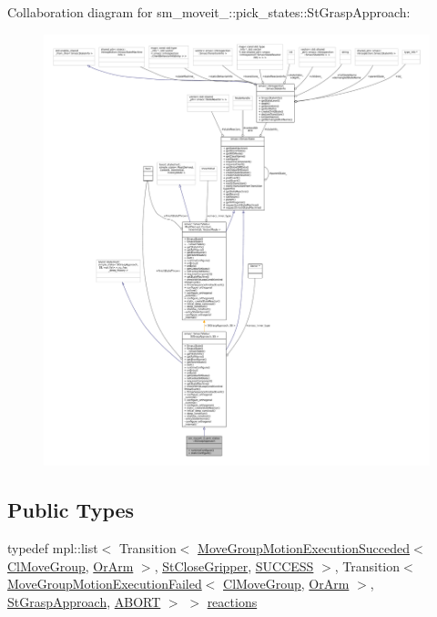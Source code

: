 Collaboration diagram for sm\+\_\+moveit\+\_\+:\+:pick\+\_\+states\+:\+:St\+Grasp\+Approach\+:
\nopagebreak
\begin{figure}[H]
\begin{center}
\leavevmode
\includegraphics[width=350pt]{structsm__moveit__2_1_1pick__states_1_1StGraspApproach__coll__graph}
\end{center}
\end{figure}
\subsection*{Public Types}
\begin{DoxyCompactItemize}
\item 
typedef mpl\+::list$<$ Transition$<$ \hyperlink{structmove__group__interface__client_1_1MoveGroupMotionExecutionSucceded}{Move\+Group\+Motion\+Execution\+Succeded}$<$ \hyperlink{classmove__group__interface__client_1_1ClMoveGroup}{Cl\+Move\+Group}, \hyperlink{classsm__moveit__2_1_1OrArm}{Or\+Arm} $>$, \hyperlink{structsm__moveit__2_1_1pick__states_1_1StCloseGripper}{St\+Close\+Gripper}, \hyperlink{classSUCCESS}{S\+U\+C\+C\+E\+SS} $>$, Transition$<$ \hyperlink{structmove__group__interface__client_1_1MoveGroupMotionExecutionFailed}{Move\+Group\+Motion\+Execution\+Failed}$<$ \hyperlink{classmove__group__interface__client_1_1ClMoveGroup}{Cl\+Move\+Group}, \hyperlink{classsm__moveit__2_1_1OrArm}{Or\+Arm} $>$, \hyperlink{structsm__moveit__2_1_1pick__states_1_1StGraspApproach}{St\+Grasp\+Approach}, \hyperlink{classABORT}{A\+B\+O\+RT} $>$ $>$ \hyperlink{structsm__moveit__2_1_1pick__states_1_1StGraspApproach_a196015ebae8ff30eddaab5b5a2d48711}{reactions}
\end{DoxyCompactItemize}
